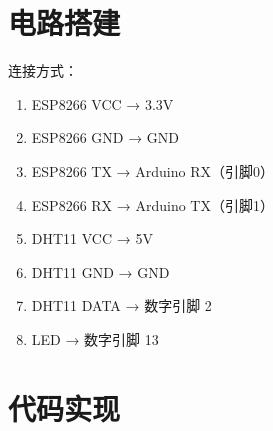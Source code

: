 \documentclass[12pt,UTF8]{ctexbook}
\begin{document}
\section{电路搭建}

连接方式：
\begin{enumerate}
    \item ESP8266 VCC → 3.3V
    \item ESP8266 GND → GND
    \item ESP8266 TX → Arduino RX（引脚0）
    \item ESP8266 RX → Arduino TX（引脚1）
    \item DHT11 VCC → 5V
    \item DHT11 GND → GND
    \item DHT11 DATA → 数字引脚 2
    \item LED → 数字引脚 13
\end{enumerate}

\section{代码实现}
\end{document}
